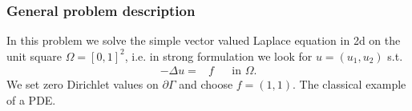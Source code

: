 \subsubsection{General problem description}
In this problem we solve the simple vector valued Laplace equation in 2d
on the unit square $\Omega=[0,1]^2$, i.e. in strong formulation we look for $u=(u_1,u_2)$ s.t.
\begin{align*}
-\Delta u =& f &&\text{in }\Omega.
\end{align*}
We set zero Dirichlet values on $\partial \Gamma$ and choose $f=(1,1)$. The classical example of a PDE.

